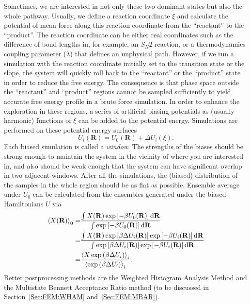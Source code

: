 Sometimes, we are interested in not only these two dominant states but also the whole pathway. Usually, we define a reaction coordinate $\xi$ and calculate the potential of mean force along this reaction coordinate from the ``reactant'' to the ``product''. The reaction coordinate can be either real coordinates such as the difference of bond lengths in, for example, an $S_N2$ reaction, or a thermodynamics coupling parameter ($\lambda$) that defines an unphysical path. However, if we run a simulation with the reaction coordinate initially set to the transition state or the slope, the system will quickly roll back to the ``reactant'' or the ``product'' state in order to reduce the free energy. The consequence is that phase space outside the ``reactant'' and ``product'' regions cannot be sampled sufficiently to yield accurate free energy profile in a brute force simulation. In order to enhance the exploration in these regions, a series of artificial biasing potentials as (usually harmonic) functions of $\xi$ can be added to the potential energy. Simulations are performed on these potential energy surfaces 
\begin{equation}
	U_i(\mathbf{R})=U_0(\mathbf{R})+\Delta U_i(\xi).
\end{equation}
Each biased simulation is called a \textit{window}. The strengths of the biases should be strong enough to maintain the system in the vicinity of where you are interested in, and also should be weak enough that the system can have significant overlap in two adjacent windows. After all the simulations, the (biased) distribution of the samples in the whole region should be as flat as possible. Ensemble average under $U_0$ can be calculated from the ensembles generated under the biased Hamiltonians $U$ via
\begin{align}
	\left<X(\mathbf{R})\right>_0=&\frac{\int X(\mathbf{R})\exp{\left[-\beta U_0(\mathbf{R})\right]}\mathop{}\!\mathrm{d}\mathbf{R}}{\int \exp{\left[-\beta U_0(\mathbf{R})\right]}\mathop{}\!\mathrm{d}\mathbf{R}}\notag\\
	                            =&\frac{\int X(\mathbf{R})\exp{\left[\beta \Delta U_i(\mathbf{R})\right]}\exp{\left[-\beta U_i(\mathbf{R})\right]}\mathop{}\!\mathrm{d}\mathbf{R}}{\int \exp{\left[\beta \Delta U_i(\mathbf{R})\right]}\exp{\left[-\beta U_i(\mathbf{R})\right]}\mathop{}\!\mathrm{d}\mathbf{R}}\notag\\
	                =&\frac{\left<X\exp{\left(\beta\Delta U_i\right)}\right>_i}{\left<\exp{\left(\beta\Delta U_i\right)}\right>_i}.
	\label{Eq:ES:US:reweighting}
\end{align}
Better postprocessing methods are the Weighted Histogram Analysis Method and the Multistate Bennett Acceptance Ratio method (to be discussed in Section~\ref{Sec:FEM:WHAM} and~\ref{Sec:FEM:MBAR}).